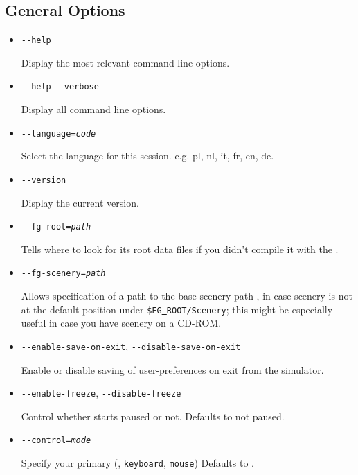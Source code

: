 \subsection{General Options}\label{generaloptions}
\begin{itemize}
\item{\texttt{-$ $-help}}

  Display the most relevant command line options.

\item{\texttt{-$ $-help} \texttt{-$ $-verbose}}

  Display all command line options.

\item{\texttt{-$ $-language={\it code}}}

  Select the language for this session. e.g. pl, nl, it, fr, en, de.

\item{\texttt{-$ $-version} }

Display the current \FlightGear{} version.

\item{\texttt{-$ $-fg-root={\it path}}}

  Tells \FlightGear{} where to look for its root data files if you
  didn't compile it with the .

\item{\texttt{-$ $-fg-scenery={\it path}}}

  Allows specification of a path to the base scenery path
  , in case scenery is not at the default
  position under \texttt{\$FG\underline{~}ROOT/Scenery}; this might
  be especially useful in case you have scenery on a CD-ROM.

\item{\texttt{-$ $-enable-save-on-exit}, \texttt{-$ $-disable-save-on-exit}}

  Enable or disable saving of user-preferences on exit from the simulator.

\item{\texttt{-$ $-enable-freeze}, \texttt{-$ $-disable-freeze}}

  Control whether \FlightGear{} starts paused or not. Defaults to not paused.

\item{\texttt{-$ $-control={\it mode}}}

  Specify your primary  (,  \texttt{keyboard},
  \texttt{mouse}) Defaults to .


\end{itemize}
